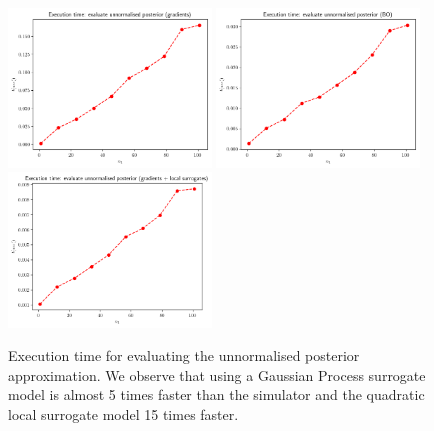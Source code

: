\begin{figure}[ht]
    \begin{center}
      \includegraphics[width=0.48\textwidth]{./Thesis/images/chapter4/exec_posterior_grad.png}
      \includegraphics[width=0.48\textwidth]{./Thesis/images/chapter4/exec_posterior_bo.png}\\
      \includegraphics[width=0.48\textwidth]{./Thesis/images/chapter4/exec_posterior_grad_fit.png}
    \end{center}
    \caption[Execution time for evaluation the unnormalised posterior.]{Execution time for evaluating the unnormalised posterior
      approximation. We observe that using a Gaussian Process surrogate model is almost 5 times faster than the simulator and the quadratic local surrogate model 15 times faster.}
  \label{fig:exec_posterior}
\end{figure}


